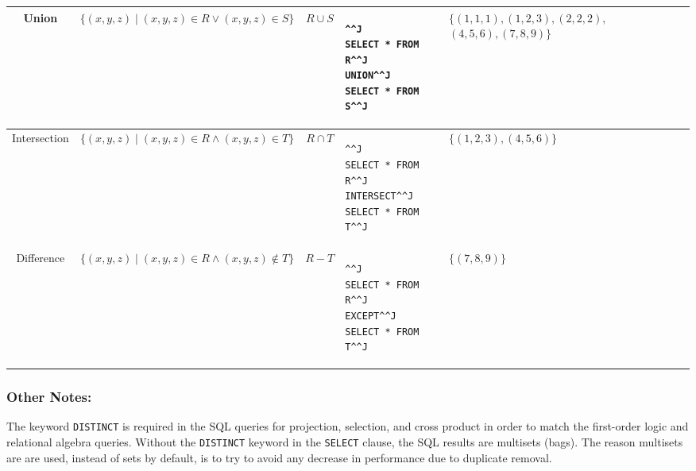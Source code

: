 \documentclass[landscape]{article}
\newcommand{\intersect}{\cap}
\newcommand{\union}{\cup}
\begin{document}
\begin{tabularx}{\textwidth}{|c|c|c|X|X|}
 \hline

Union & $\{(x,y,z) \mid (x,y,z) \in R \vee (x,y,z) \in S \}$ & $R \union S$ & 
\multicolumn{1}{m{\tempwidth}|}{
\begin{lstlisting}^^J
SELECT * FROM R^^J
UNION^^J
SELECT * FROM S^^J
\end{lstlisting} }
& \multicolumn{1}{m{7cm}|}{$\{ (1,1,1), (1,2,3), (2,2,2),$ $(4,5,6), (7,8,9) \}$} \\

 \hline

Intersection & $\{(x,y,z) \mid (x,y,z) \in R \wedge (x,y,z)
\in T \}$ & $R \intersect T$ &
\multicolumn{1}{m{\tempwidth}|}{
\begin{lstlisting}^^J
SELECT * FROM R^^J
INTERSECT^^J
SELECT * FROM T^^J
\end{lstlisting} }
& $\{ (1,2,3), (4,5,6) \}$ \\

 \hline

Difference & $\{(x,y,z) \mid (x,y,z) \in R \wedge (x,y,z) \not\in T \}$ & $R - T$ & 
\multicolumn{1}{m{\tempwidth}|}{
\begin{lstlisting}^^J
SELECT * FROM R^^J
EXCEPT^^J
SELECT * FROM T^^J
\end{lstlisting} }
& $\{(7,8,9)\}$ \\

 \hline

\end{tabularx}
\egroup

\subsubsection*{Other Notes:}

The keyword \texttt{DISTINCT} is required in the SQL queries for
projection, selection, and cross product in order to match the
first-order logic and relational algebra queries.  Without the
\texttt{DISTINCT} keyword in the \texttt{SELECT} clause, the SQL
results are multisets (bags).  The reason multisets are are used,
instead of sets by default, is to try to avoid any decrease in
performance due to duplicate removal.
\end{document}
